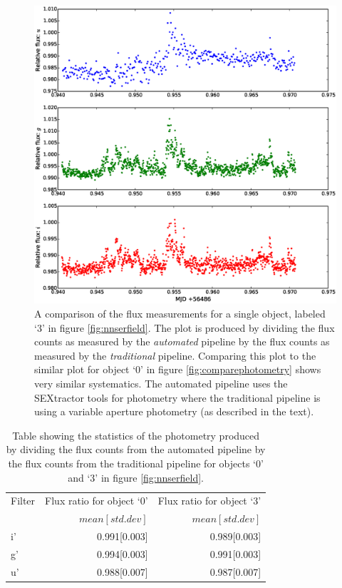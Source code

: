 \begin{figure}
\centering
\includegraphics[width=140mm]{images/compare_photometry_2.eps}
\caption{A comparison of the flux measurements for a single object, labeled `3' in figure \ref{fig:nnserfield}. The plot is produced by dividing the flux counts as measured by the \emph{automated} pipeline by the flux counts as measured by the \emph{traditional} pipeline. Comparing this plot to the similar plot for object `0' in figure \ref{fig:comparephotometry} shows very similar systematics. The automated pipeline uses the SEXtractor tools for photometry where the traditional pipeline is using a variable aperture photometry (as described in the text).}
\label{fig:comparephotometry2}
\end{figure}

\begin{table}
  \centering
  \begin{tabular}{l r r }
    \hline
    Filter & Flux ratio for object `0' & Flux ratio  for object `3'\\
           &  $mean[std. dev]$ &  $mean[std. dev]$\\
    \hline
    i'    & 0.991[0.003]  & 0.989[0.003] \\
    g'    & 0.994[0.003] & 0.991[0.003]\\
    u'    & 0.988[0.007] & 0.987[0.007]\\
    \hline
   \end{tabular}
  \caption{Table showing the statistics of the photometry produced by dividing the flux counts from the automated pipeline by the flux counts from the traditional pipeline for objects `0'  and `3' in figure \ref{fig:nnserfield}.}
  \label{tab:differential}
\end{table}

